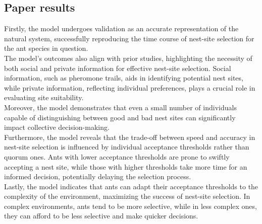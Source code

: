 \documentclass{article}
\begin{document}
\subsection{Paper results}
Firstly, the model undergoes validation as an accurate representation of the natural system, successfully reproducing the time course of nest-site selection for the ant species in question.\\
The model's outcomes also align with prior studies, highlighting the necessity of both social and private information for effective nest-site selection. Social information, such as pheromone trails, aids in identifying potential nest sites, while private information, reflecting individual preferences, plays a crucial role in evaluating site suitability.\\
Moreover, the model demonstrates that even a small number of individuals capable of distinguishing between good and bad nest sites can significantly impact collective decision-making.\\
Furthermore, the model reveals that the trade-off between speed and accuracy in nest-site selection is influenced by individual acceptance thresholds rather than quorum ones. Ants with lower acceptance thresholds are prone to swiftly accepting a nest site, while those with higher thresholds take more time for an informed decision, potentially delaying the selection process.\\
Lastly, the model indicates that ants can adapt their acceptance thresholds to the complexity of the environment, maximizing the success of nest-site selection. In complex environments, ants tend to be more selective, while in less complex ones, they can afford to be less selective and make quicker decisions.

 
\end{document}
